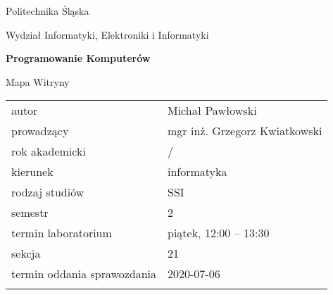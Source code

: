 \documentclass[12pt,a4paper,twoside]{article}
\newcounter{rok}
\newcommand{\rokakademicki}{%
   \setcounter{rok}{\number\year}%
   \ifthenelse{\number\month<10}%
   {\addtocounter{rok}{-1}}%
   {}%
   \arabic{rok}/\addtocounter{rok}{1}\arabic{rok}
}
\begin{document}
\frenchspacing
\thispagestyle{empty}
\begin{center}
{\Large\sf Politechnika Śląska   %

Wydział Informatyki, Elektroniki i Informatyki

}

\vfill

 

\vfill\vfill

{\Huge\sffamily\bfseries Programowanie Komputerów\par}  

\vfill\vfill

{\LARGE\sf Mapa Witryny}   


\vfill \vfill\vfill\vfill






\begin{tabular}{ll}
	\toprule
	autor                       & Michał Pawłowski    \\
	prowadzący                  &  mgr inż. Grzegorz Kwiatkowski   \\
	rok akademicki              & \rokakademicki         \\
	kierunek                    & informatyka            \\
	rodzaj studiów              & SSI                    \\
	semestr                     & 2                      \\
	termin laboratorium         & piątek, 12:00 -- 13:30 \\
	sekcja                      & 21                     \\
	termin oddania sprawozdania & 2020-07-06             \\
	\bottomrule
	                            &
\end{tabular}

\end{center}

\cleardoublepage

\end{document}
